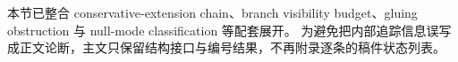 \documentclass[../../../main.tex]{subfiles}
\begin{document}

\begin{remark}
本节已整合 conservative-extension chain、branch visibility budget、gluing obstruction 与 null-mode classification 等配套展开。
为避免把内部追踪信息误写成正文论断，主文只保留结构接口与编号结果，不再附录逐条的稿件状态列表。
\end{remark}
\end{document}
